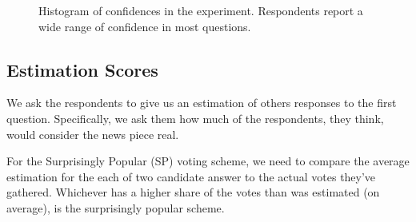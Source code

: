 \documentclass{report}
\theoremstyle{definition}
\begin{document}
\begin{figure}[H]
    \centering
    \caption{Histogram of confidences in the experiment. Respondents report a wide range of confidence in most questions.}
    \label{fig:conf_hist}
\end{figure}

\newpage
\subsection{Estimation Scores}
We ask the respondents to give us an estimation of others responses to the first question. Specifically, we ask them how much of the respondents, they think, would consider the news piece real.

For the Surprisingly Popular (SP) voting scheme, we need to compare the average estimation for the each of two candidate answer to the actual votes they've gathered. Whichever has a higher share of the votes than was estimated (on average), is the surprisingly popular scheme.
\end{document}
